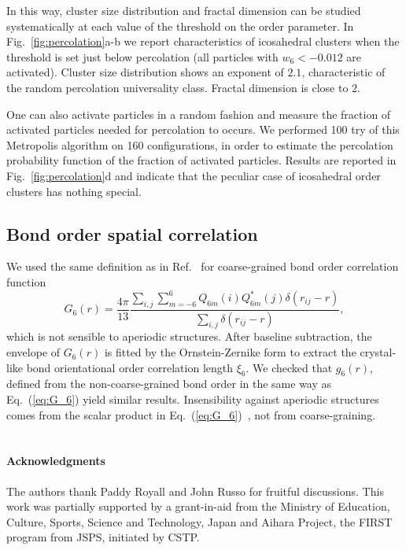 In this way, cluster size distribution and fractal dimension can be studied systematically at each value of the threshold on the order parameter. In Fig.~\ref{fig:percolation}a-b we report characteristics of icosahedral clusters when the threshold is set just below percolation (all particles with $w_6<-0.012$ are activated). Cluster size distribution shows an exponent of $2.1$, characteristic of the random percolation universality class. Fractal dimension is close to $2$.

One can also activate particles in a random fashion and measure the fraction of activated particles needed for percolation to occurs. We performed 100 try of this Metropolis algorithm on 160 configurations, in order to estimate the percolation probability function of the fraction of activated particles. Results are reported in Fig.~\ref{fig:percolation}d and indicate that the peculiar case of icosahedral order clusters has nothing special.

\subsection*{Bond order spatial correlation}

We used the same definition as in Ref.~\cite{tanaka2010critical} for coarse-grained bond order correlation function
\begin{equation}
	G_6(r) = \frac{4\pi}{13}\frac{\sum_{i,j} \sum_{m=-6}^{6} Q_{6 m}(i) Q_{6 m}^{*}(j) \delta(r_{ij}-r)}{\sum_{i,j} \delta(r_{ij}-r)},
	\label{eq:G_6}
\end{equation}
which is not sensible to aperiodic structures. After baseline subtraction, the envelope of $G_6(r)$ is fitted by the Ornstein-Zernike form to extract the crystal-like bond orientational order correlation length $\xi_6$. We checked that $g_6(r)$, defined from the non-coarse-grained bond order in the same way as Eq.~(\ref{eq:G_6}) yield similar results. Insensibility against aperiodic structures comes from the scalar product in Eq.~(\ref{eq:G_6})~\cite{Tomida1995}, not from coarse-graining.

%



\section*{}
\paragraph*{\bf Acknowledgments}
The authors thank Paddy Royall and John Russo for fruitful discussions. 
This work was partially supported by a grant-in-aid from the 
Ministry of Education, Culture, Sports, Science and Technology, Japan and 
Aihara Project, the FIRST program from JSPS, initiated by CSTP. 

